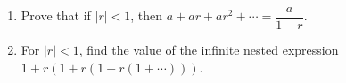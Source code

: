 \begin{enumerate}
\item[(a)] Prove that if $|r|<1$, then $a+ar+ar^2+\cdots=\dfrac{a}{1-r}$.
\item[(b)] For $|r|<1$, find the value of the infinite nested expression $1+r\left(1+r\left(1+r\left(1+\cdots\right)\right)\right)$.
\end{enumerate}
